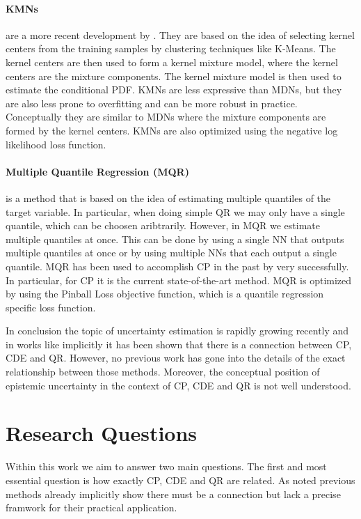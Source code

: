 \paragraph{KMNs} are a more recent development by \cite{ambrogioni2017kernel}. They are based on the idea of selecting kernel centers from the training samples by clustering techniques like K-Means. The kernel centers are then used to form a kernel mixture model, where the kernel centers are the mixture components. The kernel mixture model is then used to estimate the conditional PDF. KMNs are less expressive than MDNs, but they are also less prone to overfitting and can be more robust in practice. Conceptually they are similar to MDNs where the mixture components are formed by the kernel centers. KMNs are also optimized using the negative log likelihood loss function.

\paragraph{Multiple Quantile Regression (MQR)} is a method that is based on the idea of estimating multiple quantiles of the target variable. In particular, when doing simple QR we may only have a single quantile, which can be choosen aribtrarily. However, in MQR we estimate multiple quantiles at once. This can be done by using a single NN that outputs multiple quantiles at once or by using multiple NNs that each output a single quantile. MQR has been used to accomplish CP in the past by \cite{sesia2021conformal} very successfully. In particular, for CP it is the current state-of-the-art method. MQR is optimized by using the Pinball Loss objective function, which is a quantile regression specific loss function.

In conclusion the topic of uncertainty estimation is rapidly growing recently and in works like \cite{chernozhukov2021distributional} implicitly it has been shown that there is a connection between CP, CDE and QR. However, no previous work has gone into the details of the exact relationship between those methods. Moreover, the conceptual position of epistemic uncertainty in the context of CP, CDE and QR is not well understood.

\section{Research Questions}\label{sec:questions}

Within this work we aim to answer two main questions. The first and most essential question is how exactly CP, CDE and QR are related. As noted previous methods already implicitly show there must be a connection \cite{sesia2021conformal,chernozhukov2021distributional,chung2020beyond} but lack a precise framwork for their practical application.

